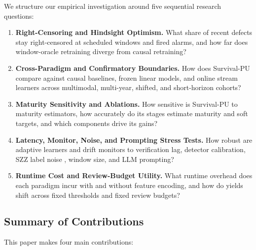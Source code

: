 \documentclass[pdflatex,sn-basic]{sn-jnl}
\theoremstyle{definition}
\theoremstyle{plain}
\begin{document}
We structure our empirical investigation around five sequential research questions:

\begin{enumerate}[leftmargin=2.2em,label=\textbf{RQ\arabic*:},itemsep=0.02em,topsep=0.20em]
  \item \textbf{Right-Censoring and Hindsight Optimism.} What share of recent defects stay right-censored at scheduled windows and fired alarms, and how far does window-oracle retraining diverge from causal retraining?
  \item \textbf{Cross-Paradigm and Confirmatory Boundaries.} How does Survival-PU compare against causal baselines, frozen linear models, and online stream learners across multimodal, multi-year, shifted, and short-horizon cohorts?
  \item \textbf{Maturity Sensitivity and Ablations.} How sensitive is Survival-PU to maturity estimators, how accurately do its stages estimate maturity and soft targets, and which components drive its gains?
  \item \textbf{Latency, Monitor, Noise, and Prompting Stress Tests.} How robust are adaptive learners and drift monitors to verification lag, detector calibration, SZZ label noise \citep{bludau2026quantifying}, window size, and LLM prompting?
  \item \textbf{Runtime Cost and Review-Budget Utility.} What runtime overhead does each paradigm incur with and without feature encoding, and how do yields shift across fixed thresholds and fixed review budgets?
\end{enumerate}

\subsection{Summary of Contributions}
\label{sec:contributions}

This paper makes four main contributions:
\end{document}
